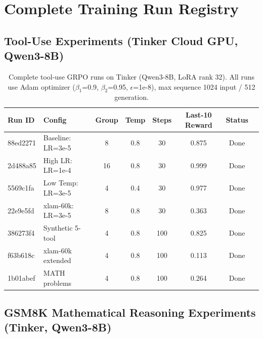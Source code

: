 \documentclass{article}
\begin{document}
\section{Complete Training Run Registry}

\subsection{Tool-Use Experiments (Tinker Cloud GPU, Qwen3-8B)}

\begin{table}[htbp]
    \centering
    \caption{Complete tool-use GRPO runs on Tinker (Qwen3-8B, LoRA rank 32). All runs use Adam optimizer ($\beta_1$=0.9, $\beta_2$=0.95, $\epsilon$=1e-8), max sequence 1024 input / 512 generation.}
    \begin{tabular}{llcccccl}
        \toprule
        Run ID & Config & Group & Temp & Steps & Last-10 Reward & Status \\
        \midrule
        88ed2271 & Baseline: LR=3e-5 & 8 & 0.8 & 30 & 0.875 & Done \\
        2d488a85 & High LR: LR=1e-4 & 16 & 0.8 & 30 & 0.999 & Done \\
        5569c1fa & Low Temp: LR=3e-5 & 4 & 0.4 & 30 & 0.977 & Done \\
        22e9e5fd & xlam-60k: LR=3e-5 & 8 & 0.8 & 30 & 0.363 & Done \\
        386273f4 & Synthetic 5-tool & 4 & 0.8 & 100 & 0.825 & Done \\
        f63b618c & xlam-60k extended & 4 & 0.8 & 100 & 0.113 & Done \\
        1b01abef & MATH problems & 4 & 0.8 & 100 & 0.264 & Done \\
        \bottomrule
    \end{tabular}
    \label{tab:tool_runs}
\end{table}

\subsection{GSM8K Mathematical Reasoning Experiments (Tinker, Qwen3-8B)}
\end{document}
